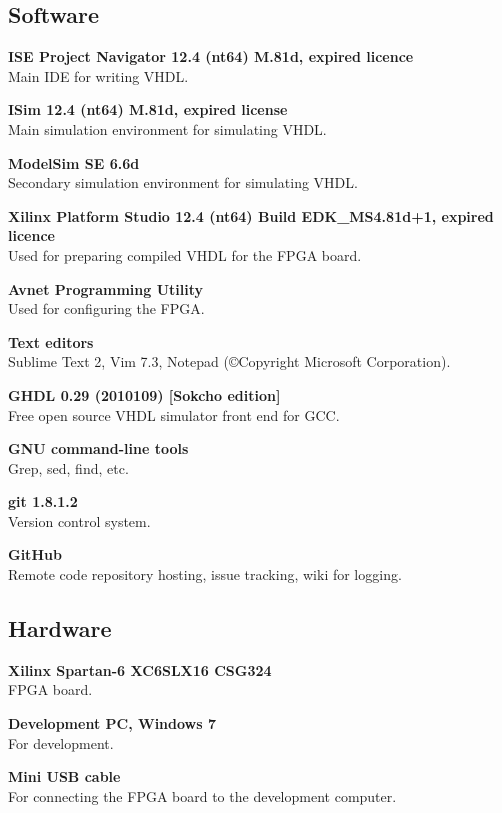 
\subsection{Software}
\begin{description}
    \item{\textbf{ISE Project Navigator 12.4 (nt64) M.81d, expired licence}} \\
        Main IDE for writing VHDL.
    \item{\textbf{ISim 12.4 (nt64) M.81d, expired license}} \\
        Main simulation environment for simulating VHDL.
    \item{\textbf{ModelSim SE 6.6d}} \\
        Secondary simulation environment for simulating VHDL.
    \item{\textbf{Xilinx Platform Studio 12.4 (nt64) Build EDK\_MS4.81d+1, expired licence}} \\
        Used for preparing compiled VHDL for the FPGA board.
    \item{\textbf{Avnet Programming Utility}} \\
        Used for configuring the FPGA.
    \item{\textbf{Text editors}} \\
        Sublime Text 2, Vim 7.3, Notepad (©Copyright Microsoft Corporation).
    \item{\textbf{GHDL 0.29 (2010109) [Sokcho edition]}} \\
        Free open source VHDL simulator front end for GCC.

    \item{\textbf{GNU command-line tools}} \\
        Grep, sed, find, etc.
    \item{\textbf{git 1.8.1.2}} \\
        Version control system.
    \item{\textbf{GitHub}} \\
        Remote code repository hosting, issue tracking, wiki for logging.
\end{description}

\subsection{Hardware}
\begin{description}
\item{\textbf{Xilinx Spartan-6 XC6SLX16 CSG324}} \\
    FPGA board.
\item{\textbf{Development PC, Windows 7}} \\
    For development.
\item{\textbf{Mini USB cable}} \\
    For connecting the FPGA board to the development computer.
\end{description}


